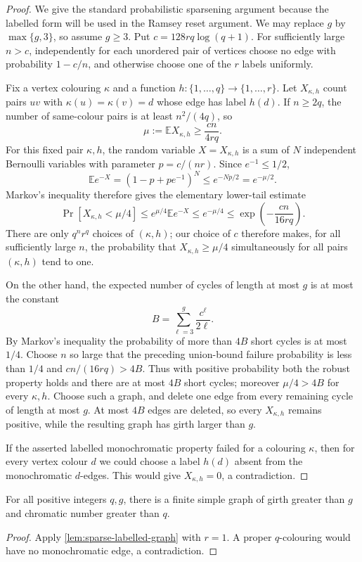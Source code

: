 \begin{proof}
We give the standard probabilistic sparsening argument because the labelled
form will be used in the Ramsey reset argument. We may replace \(g\) by
\(\max\{g,3\}\), so assume \(g\ge3\). Put
\(c=128rq\log(q+1)\).  For sufficiently large \(n>c\), independently for each unordered
pair of vertices choose no edge with probability \(1-c/n\), and otherwise
choose one of the \(r\) labels uniformly.

Fix a vertex colouring \(\kappa\) and a function
\(h:\{1,\ldots,q\}\to\{1,\ldots,r\}\).  Let \(X_{\kappa,h}\) count pairs
\(uv\) with \(\kappa(u)=\kappa(v)=d\) whose edge has label \(h(d)\).  If
\(n\geq2q\), the number of same-colour pairs is at least \(n^2/(4q)\), so
\[
 \mu:=\mathbb E X_{\kappa,h}\geq \frac{cn}{4rq}.
\]
For this fixed pair \(\kappa,h\), the random variable \(X=X_{\kappa,h}\)
is a sum of \(N\) independent Bernoulli variables with parameter
\(p=c/(nr)\). Since \(e^{-1}\le1/2\),
\[
 \mathbb E e^{-X}=(1-p+pe^{-1})^N\le e^{-Np/2}=e^{-\mu/2}.
\]
Markov's inequality therefore gives the elementary lower-tail estimate
\[
 \Pr[X_{\kappa,h}<\mu/4]\le e^{\mu/4}\mathbb E e^{-X}
 \le e^{-\mu/4}\le \exp\!\left(-\frac{cn}{16rq}\right).
\]
There are only \(q^n r^q\) choices of \((\kappa,h)\); our choice of \(c\)
therefore makes, for all sufficiently large \(n\), the probability that
\(X_{\kappa,h}\geq\mu/4\) simultaneously for all pairs
\((\kappa,h)\) tend to one.

On the other hand, the expected number of cycles of length at most \(g\) is
at most the constant
\[
 B=\sum_{\ell=3}^{g}\frac{c^\ell}{2\ell}.
\]
By Markov's inequality the probability of more than \(4B\) short cycles
is at most \(1/4\). Choose \(n\) so large that the preceding union-bound
failure probability is less than \(1/4\) and \(cn/(16rq)>4B\). Thus with
positive probability both the robust property holds and there are at most
\(4B\) short cycles; moreover \(\mu/4>4B\) for every \(\kappa,h\).
Choose such a graph, and delete one edge from every remaining cycle of length at
most \(g\).  At most \(4B\) edges are deleted, so every
\(X_{\kappa,h}\) remains positive, while the resulting graph has girth
larger than \(g\).

If the asserted labelled monochromatic property failed for a colouring
\(\kappa\), then for every vertex colour \(d\) we could choose a label
\(h(d)\) absent from the monochromatic \(d\)-edges.  This would give
\(X_{\kappa,h}=0\), a contradiction.
\end{proof}

\begin{corollary}\label{cor:high-girth-high-chromatic}
For all positive integers \(q,g\), there is a finite simple graph of girth
greater than \(g\) and chromatic number greater than \(q\).
\end{corollary}
\begin{proof}
Apply \cref{lem:sparse-labelled-graph} with \(r=1\). A proper
\(q\)-colouring would have no monochromatic edge, a contradiction.
\end{proof}
